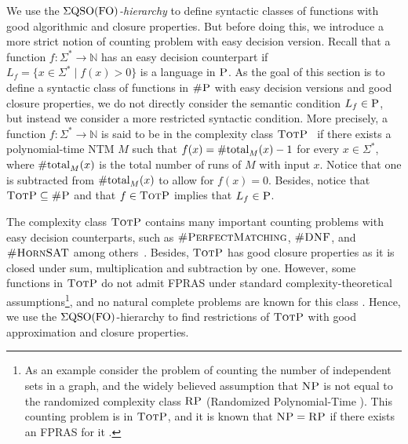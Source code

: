 
We use the \emph{$\Sigma{\rm QSO}({\rm FO})$-hierarchy} to define syntactic classes of functions with good algorithmic and closure properties.  
But before doing this, we introduce a more strict notion of counting problem with easy decision version.
Recall that a function $f\colon\Sigma^* \to \mathbb{N}$ has an easy decision counterpart if $L_f = \{ x \in \Sigma^* \mid f(x) > 0 \}$ is a language in $\text{\sc P}$. As the goal of this section is to define a syntactic class of functions in $\text{\sc \#P}$ with easy decision versions and good closure properties, we do not directly consider the semantic condition $L_f  \in \text{\sc P}$, but instead we consider a more restricted syntactic condition. More precisely, a function $f\colon\Sigma^* \to \mathbb{N}$ is said to be in the complexity class $\text{\sc TotP}$~\cite{PagourtzisZ06} if there exists a  polynomial-time NTM $M$ such that $f(x) = \text{\rm \#total}_M(x) - 1$ for every $x \in \Sigma^*$, where $\text{\rm \#total}_M(x)$ is the total number of runs of $M$ with input $x$. Notice that one is subtracted from $\text{\rm \#total}_M(x)$ to allow for $f(x) = 0$. Besides, notice that $\text{\sc TotP} \subseteq \text{\sc \#P}$ and that $f \in \text{\sc TotP}$ implies that $L_f \in \text{\sc P}$. 

The complexity class $\text{\sc TotP}$ contains many important counting problems with easy decision counterparts, such as $\textsc{\#PerfectMatching}$, $\textsc{\#DNF}$, and $\textsc{\#HornSAT}$ among others~\cite{PagourtzisZ06}. Besides, $\text{\sc TotP}$ has good closure properties as it is closed under sum, multiplication and subtraction by one. However, some functions in $\text{\sc TotP}$ do not admit FPRAS under standard complexity-theoretical assumptions\footnote{As an example consider the problem of counting the number of independent sets in a graph, and the widely believed assumption that $\text{\sc NP}$ is not equal to the randomized complexity class $\text{\sc RP}$ (Randomized Polynomial-Time \cite{G77}). This counting problem is in $\text{\sc TotP}$, and it is known that $\text{\sc NP} = \text{\sc RP}$ if there exists an FPRAS for it \cite{DFJ02}.}, and no natural complete problems are known for this class \cite{PagourtzisZ06}. Hence, we use the $\Sigma{\rm QSO}({\rm FO})$-hierarchy to find restrictions of $\text{\sc TotP}$ with good approximation and closure properties.

